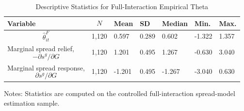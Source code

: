 \begin{table}[H]\centering
\begin{threeparttable}
\caption{Descriptive Statistics for Full-Interaction Empirical Theta}
\label{tab:theta_descriptive_stats}
\scriptsize
\begin{tabularx}{\textwidth}{lYYYYYY}
\toprule
Variable & $$N$$ & Mean & SD & Median & Min. & Max. \\
\midrule
$$\widehat{\theta}^{F}_{it}$$ & 1,120 & 0.597 & 0.289 & 0.602 & -1.322 & 1.357 \\
Marginal spread relief, $$-\partial s^g/\partial G$$ & 1,120 & 1.201 & 0.495 & 1.267 & -0.630 & 3.040 \\
Marginal spread response, $$\partial s^g/\partial G$$ & 1,120 & -1.201 & 0.495 & -1.267 & -3.040 & 0.630 \\
\bottomrule
\end{tabularx}
\begin{tablenotes}[flushleft]\footnotesize
\item Notes: Statistics are computed on the controlled full-interaction spread-model estimation sample.
\end{tablenotes}
\end{threeparttable}
\end{table}
